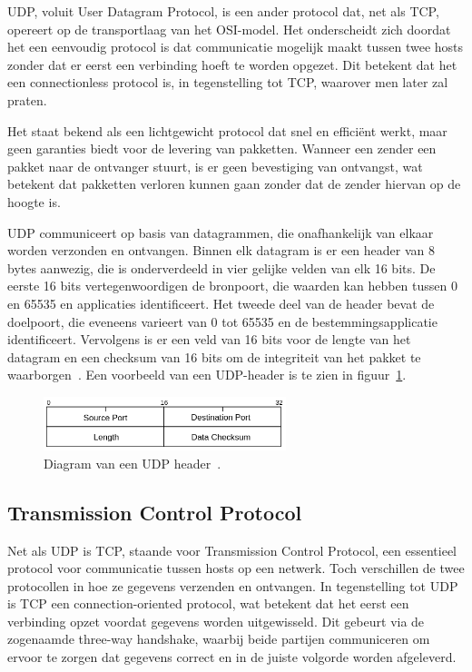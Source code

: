 UDP, voluit User Datagram Protocol, is een ander protocol dat, net als TCP, opereert op de transportlaag van het OSI-model.
Het onderscheidt zich doordat het een eenvoudig protocol is dat communicatie mogelijk maakt tussen twee hosts zonder dat er eerst een verbinding hoeft te worden opgezet.
Dit betekent dat het een connectionless protocol is, in tegenstelling tot TCP, waarover men later zal praten.

Het staat bekend als een lichtgewicht protocol dat snel en effici\"ent werkt, maar geen garanties biedt voor de levering van pakketten.
Wanneer een zender een pakket naar de ontvanger stuurt, is er geen bevestiging van ontvangst, wat betekent dat pakketten verloren kunnen gaan zonder dat de zender hiervan op de hoogte is.

UDP communiceert op basis van datagrammen, die onafhankelijk van elkaar worden verzonden en ontvangen.
Binnen elk datagram is er een header van 8 bytes aanwezig, die is onderverdeeld in vier gelijke velden van elk 16 bits.
De eerste 16 bits vertegenwoordigen de bronpoort, die waarden kan hebben tussen 0 en 65535 en applicaties identificeert.
Het tweede deel van de header bevat de doelpoort, die eveneens varieert van 0 tot 65535 en de bestemmingsapplicatie identificeert.
Vervolgens is er een veld van 16 bits voor de lengte van het datagram en een checksum van 16 bits om de integriteit van het pakket te waarborgen~\autocite{dordal2020}.
Een voorbeeld van een UDP-header is te zien in figuur~\ref{fig:netwerk-udp-header}.

\begin{figure}[h!]
    \begin{center}
        \includegraphics[width=200pt]
        {./graphics/network/udp-header.png}
        \caption[UDP header diagram.]{\label{fig:netwerk-udp-header}Diagram van een UDP header~\autocite{dordal2020}.}
    \end{center}
\end{figure}

\subsection{Transmission Control Protocol}
\label{netwerk_tcp}

Net als UDP is TCP, staande voor Transmission Control Protocol, een essentieel protocol voor communicatie tussen hosts op een netwerk.
Toch verschillen de twee protocollen in hoe ze gegevens verzenden en ontvangen.
In tegenstelling tot UDP is TCP een connection-oriented protocol, wat betekent dat het eerst een verbinding opzet voordat gegevens worden uitgewisseld.
Dit gebeurt via de zogenaamde three-way handshake, waarbij beide partijen communiceren om ervoor te zorgen dat gegevens correct en in de juiste volgorde worden afgeleverd.

